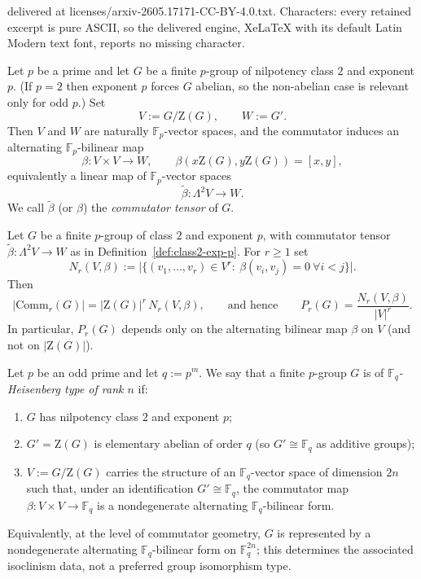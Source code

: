 \documentclass[10pt,a4paper]{amsart}
\newcommand{\Comm}{\mathrm{Comm}}
\newcommand{\Z}{\mathrm{Z}}
\begin{document}
delivered at licenses/arxiv-2605.17171-CC-BY-4.0.txt. Characters: every retained excerpt is pure ASCII, so the delivered engine, XeLaTeX with its default Latin Modern text font, reports no missing character.
\begin{definition}\label{def:class2-exp-p}
Let $p$ be a prime and let $G$ be a finite $p$-group of nilpotency class $2$ and exponent $p$.
(If $p=2$ then exponent $p$ forces $G$ abelian, so the non-abelian case is relevant only for odd $p$.)
Set
\[
V:=G/\Z(G),\qquad W:=G'.
\]
Then $V$ and $W$ are naturally $\mathbb F_p$-vector spaces, and the commutator induces an alternating $\mathbb F_p$-bilinear map
\[
\beta:V\times V\to W,\qquad \beta(x\Z(G),y\Z(G))=[x,y],
\]
equivalently a linear map of $\mathbb F_p$-vector spaces
\[
\widetilde\beta:\Lambda^2 V\to W.
\]
We call $\widetilde\beta$ (or $\beta$) the \emph{commutator tensor} of $G$.
\end{definition}

\begin{proposition}\label{prop:class2-reduction}
Let $G$ be a finite $p$-group of class $2$ and exponent $p$, with commutator tensor $\widetilde\beta:\Lambda^2V\to W$
as in Definition~\ref{def:class2-exp-p}.
For $r\ge 1$ set
\[
N_r(V,\beta):=\big|\{(v_1,\dots,v_r)\in V^r:\ \beta(v_i,v_j)=0\ \forall i<j\}\big|.
\]
Then
\[
|\Comm_r(G)|=|\Z(G)|^r\,N_r(V,\beta),
\qquad\text{and hence}\qquad
P_r(G)=\frac{N_r(V,\beta)}{|V|^r}.
\]
In particular, $P_r(G)$ depends only on the alternating bilinear map $\beta$ on $V$ (and not on $|\Z(G)|$).
\end{proposition}

\begin{definition}\label{def:heisenberg-type}
Let $p$ be an odd prime and let $q:=p^m$.
We say that a finite $p$-group $G$ is of \emph{$\mathbb F_q$-Heisenberg type of rank $n$} if:
\begin{enumerate}
\item $G$ has nilpotency class $2$ and exponent $p$;
\item $G'=\Z(G)$ is elementary abelian of order $q$ (so $G'\cong \mathbb F_q$ as additive groups);
\item $V:=G/\Z(G)$ carries the structure of an $\mathbb F_q$-vector space of dimension $2n$ such that,
under an identification $G'\cong \mathbb F_q$, the commutator map
\(
\beta:V\times V\to \mathbb F_q
\)
is a nondegenerate alternating $\mathbb F_q$-bilinear form.
\end{enumerate}
Equivalently, at the level of commutator geometry, $G$ is represented by a nondegenerate alternating $\mathbb F_q$-bilinear form on $\mathbb F_q^{2n}$; this determines the associated isoclinism data, not a preferred group isomorphism type.
\end{definition}
\end{document}
